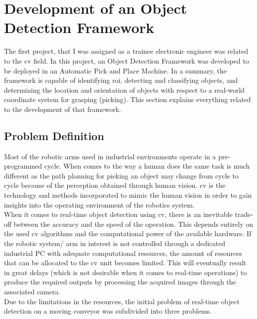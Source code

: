 \documentclass[a4paper,12pt]{report}%
\begin{document}
\section{Development of an Object Detection Framework}
\label{Development of an Object Detection Framework}
The first project, that I was assigned as a trainee electronic engineer was related to the \ac{cv} field. In this project, an Object Detection Framework was developed to be deployed in an Automatic Pick and Place Machine. In a summary, the framework is capable of identifying \ac{roi}, detecting and classifying objects, and determining the location and orientation of objects with respect to a real-world coordinate system for grasping (picking). This section explains everything related to the development of that framework.


\subsection{Problem Definition}\label{Problem Definition}
Most of the robotic arms used in industrial environments operate in a pre-programmed cycle. When comes to the way a human does the same task is much different as the path planning for picking an object may change from cycle to cycle because of the perception obtained through human vision. \Ac{cv} is the technology and methods incorporated to mimic the human vision in order to gain insights into the operating environment of the robotics system.\\

When it comes to real-time object detection using \ac{cv}, there is an inevitable trade-off between the accuracy and the speed of the operation. This depends entirely on the used \ac{cv} algorithms and the computational power of the available hardware. If the robotic system/ arm in interest is not controlled through a dedicated industrial PC with adequate computational resources, the amount of resources that can be allocated to the \ac{cv} unit becomes limited.  This will eventually result in great delays (which is not desirable when it comes to real-time operations) to produce the required outputs by processing the acquired images through the associated camera.\\

Due to the limitations in the resources, the initial problem of real-time object detection on a moving conveyor was subdivided into three problems.
\end{document}
